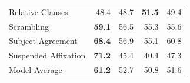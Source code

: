 \begin{tabular}{lrrrr}
Relative Clauses & \cellcolor[RGB]{255,193,96} 48.4 & \cellcolor[RGB]{255,194,97} 48.7 & \cellcolor[RGB]{247,201,97} \textbf{51.5} & \cellcolor[RGB]{255,197,98} 49.4 \\
Scrambling & \cellcolor[RGB]{208,210,81} \textbf{59.1} & \cellcolor[RGB]{221,207,87} 56.5 & \cellcolor[RGB]{227,205,89} 55.3 & \cellcolor[RGB]{226,206,88} 55.6 \\
Subject Agreement & \cellcolor[RGB]{161,220,63} \textbf{68.4} & \cellcolor[RGB]{219,207,86} 56.9 & \cellcolor[RGB]{228,205,89} 55.1 & \cellcolor[RGB]{199,211,78} 60.8 \\
Suspended Affixation & \cellcolor[RGB]{146,223,57} \textbf{71.2} & \cellcolor[RGB]{255,181,90} 45.4 & \cellcolor[RGB]{255,161,80} 40.4 & \cellcolor[RGB]{255,189,94} 47.3 \\
Model Average & \cellcolor[RGB]{197,212,77} \textbf{61.2} & \cellcolor[RGB]{241,202,94} 52.7 & \cellcolor[RGB]{250,200,98} 50.8 & \cellcolor[RGB]{246,201,96} 51.6 \\
\bottomrule
\end{tabular}
